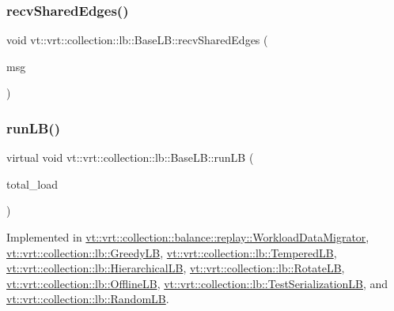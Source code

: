 \subsubsection{\texorpdfstring{recv\+Shared\+Edges()}{recvSharedEdges()}}
{\footnotesize\ttfamily void vt\+::vrt\+::collection\+::lb\+::\+Base\+L\+B\+::recv\+Shared\+Edges (\begin{DoxyParamCaption}\item[{\hyperlink{structvt_1_1vrt_1_1collection_1_1lb_1_1_comm_msg}{Comm\+Msg} $\ast$}]{msg }\end{DoxyParamCaption})}

\mbox{\label{structvt_1_1vrt_1_1collection_1_1lb_1_1_base_l_b_aa957038bb132ac29fb61535487f0604f}} 
\subsubsection{\texorpdfstring{run\+L\+B()}{runLB()}}
{\footnotesize\ttfamily virtual void vt\+::vrt\+::collection\+::lb\+::\+Base\+L\+B\+::run\+LB (\begin{DoxyParamCaption}\item[{\hyperlink{namespacevt_a8fb51741340b87d7aaee0bef60e9896b}{Load\+Type}}]{total\+\_\+load }\end{DoxyParamCaption})\hspace{0.3cm}{\ttfamily [pure virtual]}}



Implemented in \hyperlink{structvt_1_1vrt_1_1collection_1_1balance_1_1replay_1_1_workload_data_migrator_a5de7ab375cff13a695c86523765904fa}{vt\+::vrt\+::collection\+::balance\+::replay\+::\+Workload\+Data\+Migrator}, \hyperlink{structvt_1_1vrt_1_1collection_1_1lb_1_1_greedy_l_b_abe03de3d4ee3b1259707a9d5b22a7b9c}{vt\+::vrt\+::collection\+::lb\+::\+Greedy\+LB}, \hyperlink{structvt_1_1vrt_1_1collection_1_1lb_1_1_tempered_l_b_ace1513a46b9b5c195648262c5cc48783}{vt\+::vrt\+::collection\+::lb\+::\+Tempered\+LB}, \hyperlink{structvt_1_1vrt_1_1collection_1_1lb_1_1_hierarchical_l_b_a4abe2f02571b4495033e70e75ca67afe}{vt\+::vrt\+::collection\+::lb\+::\+Hierarchical\+LB}, \hyperlink{structvt_1_1vrt_1_1collection_1_1lb_1_1_rotate_l_b_a3266fa43e0459b57466d9e184aeae2f7}{vt\+::vrt\+::collection\+::lb\+::\+Rotate\+LB}, \hyperlink{structvt_1_1vrt_1_1collection_1_1lb_1_1_offline_l_b_ad6b473ed506c50b86e308fc9840a11d7}{vt\+::vrt\+::collection\+::lb\+::\+Offline\+LB}, \hyperlink{structvt_1_1vrt_1_1collection_1_1lb_1_1_test_serialization_l_b_afb9f6848d8ea2432e2121a32aee56d54}{vt\+::vrt\+::collection\+::lb\+::\+Test\+Serialization\+LB}, and \hyperlink{structvt_1_1vrt_1_1collection_1_1lb_1_1_random_l_b_a9cf59256d2c69208326310f3f8dcd3e8}{vt\+::vrt\+::collection\+::lb\+::\+Random\+LB}.


